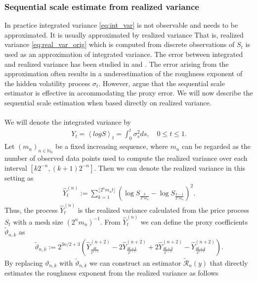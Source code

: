 \documentclass{article}
\begin{document}
\subsubsection{Sequential scale estimate from realized variance} \label{sec:seq_est_from_rv}
In practice integrated variance \eqref{eq:int_var} is not observable and needs to be approximated. It is usually approximated by realized variance  That is, realized variance \eqref{eq:real_var_orig} which is computed from discrete observations of $S_t$ is used as an approximation of integrated variance. The error between integrated and realized variance has been studied in \cite{bolko2023} and \cite{fukasawa}. The error arising from the approximation often results in a underestimation of the roughness exponent of the hidden volatility process $\sigma_t$. However, \cite{han} argue that the sequential scale estimator is effective in accommodating the proxy error. We will now describe the sequential scale estimation when based directly on realized variance.\\\\
We will denote the integrated variance by
\begin{align*}
Y_t = \left\langle log S \right\rangle_t = \int_0^t \sigma_s^2 ds, \quad 0\leq t \leq 1.
\end{align*}
Let $(m_n)_{n\in \mathbb{N}_0}$ be a fixed increasing sequence, where $m_n$ can be regarded as the number of observed data points used to compute the realized variance over each interval $[k2^{-n},(k+1)2^{-n}]$. Then we can denote the realized variance in this setting as
\begin{align}
\widehat{Y}_t^{(n)} := \sum_{k=1}^{\lfloor 2^nm_nt \rfloor} \left( \log S_{\frac{k}{2^n m_n}} - \log S_{\frac{k-1}{2^n m_n}}\right)^2 . \label{eq:rvforscale}
\end{align}
Thus, the process $\widehat{Y}_t^{(n)}$ is the realized variance calculated from the price process $S_t$ with a mesh size $(2^nm_n)^{-1}$. From $\widehat{Y}_t^{(n)}$ we can define the proxy coefficients $\widetilde{\vartheta}_{n,k}$ as
\begin{align*}
\widetilde{\vartheta}_{n,k} := 2^{3n/2+3} \left( 
\widehat{Y}_{ \frac{4k}{2^{n+2}}}^{(n+2)}
- 2\widehat{Y}_{\frac{4k+1}{2^{n+2}}}^{(n+2)}
+ 2\widehat{Y}_{\frac{4k+3}{2^{n+2}}}^{(n+2)} 
- \widehat{Y}_{\frac{4k+4}{2^{n+2}}}^{(n+2)} 
\right).
\end{align*}
By replacing $\vartheta_{n,k}$ with $\widetilde{\vartheta}_{n,k}$ we can construct an estimator $\widetilde{\mathscr{R}}_n (y)$ that directly estimates the roughness exponent from the realized variance as follows
\end{document}
